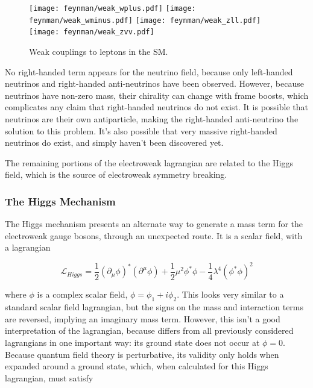 \begin{centering}
\begin{figure}[!hbt]
\myfloatalign
\texttt{[image: feynman/weak\_wplus.pdf]}
\texttt{[image: feynman/weak\_wminus.pdf]}
\texttt{[image: feynman/weak\_zll.pdf]}
\texttt{[image: feynman/weak\_zvv.pdf]}
\caption{Weak couplings to leptons in the \ac{SM}.}
\label{fig:feynman_weak}
\end{figure}
\end{centering}

No right-handed term appears for the neutrino field, because only left-handed neutrinos and right-handed anti-neutrinos have been observed. However, because neutrinos have non-zero mass, their chirality can change with frame boosts, which complicates any claim that right-handed neutrinos do not exist. It is possible that neutrinos are their own antiparticle, making the right-handed anti-neutrino the solution to this problem. It's also possible that very massive right-handed neutrinos do exist, and simply haven't been discovered yet. 

The remaining portions of the electroweak lagrangian are related to the Higgs field, which is the source of electroweak symmetry breaking. 

\subsubsection{The Higgs Mechanism}

The Higgs mechanism presents an alternate way to generate a mass term for the electroweak gauge bosons, through an unexpected route. It is a scalar field, with a lagrangian 

\begin{equation}
\mathcal{L}_{Higgs} = \frac{1}{2}(\partial_\mu\phi)^*(\partial^\mu\phi) + \frac{1}{2}\mu^2\phi^*\phi - \frac{1}{4}\lambda^4(\phi^*\phi)^2
\end{equation}

where $\phi$ is a complex scalar field, $\phi = \phi_1 + i\phi_2$. This looks very similar to a standard scalar field lagrangian, but the signs on the mass and interaction terms are reversed, implying an imaginary mass term. However, this isn't a good interpretation of the lagrangian, because differs from all previously considered lagrangians in one important way: its ground state does not occur at $\phi = 0$. Because quantum field theory is perturbative, its validity only holds when expanded around a ground state, which, when calculated for this Higgs lagrangian, must satisfy


